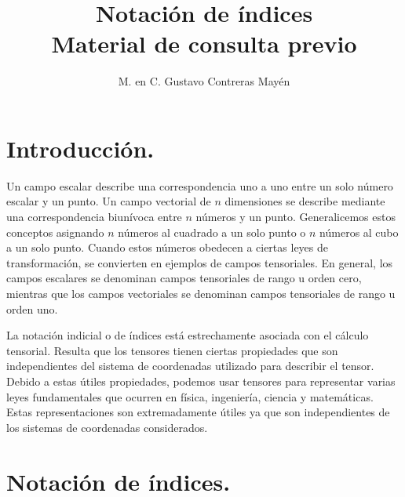 
\usetikzlibrary{babel}
\setlength{\tabcolsep}{12pt}
\title{Notación de índices \\ \large{Material de consulta previo}\vspace{-3ex}}
\author{M. en C. Gustavo Contreras Mayén}
\date{ }

\vspace{-4cm}
\maketitle
\fontsize{14}{14}\selectfont
\tableofcontents
\newpage



\section{Introducción.}

Un campo escalar describe una correspondencia uno a uno entre un solo número escalar y un punto. Un campo vectorial de $n$ dimensiones se describe mediante una correspondencia biunívoca entre $n$ números y un punto. Generalicemos estos conceptos asignando $n$ números al cuadrado a un solo punto o $n$ números al cubo a un solo punto. Cuando estos números obedecen a ciertas leyes de transformación, se convierten en ejemplos de campos tensoriales. En general, los campos escalares se denominan campos tensoriales de rango u orden cero, mientras que los campos vectoriales se denominan campos tensoriales de rango u orden uno.
\par
La notación indicial o de índices está estrechamente asociada con el cálculo tensorial. Resulta que los tensores tienen ciertas propiedades que son independientes del sistema de coordenadas utilizado para describir el tensor. Debido a estas útiles propiedades, podemos usar tensores para representar varias leyes fundamentales que ocurren en física, ingeniería, ciencia y matemáticas. Estas representaciones son extremadamente útiles ya que son independientes de los sistemas de coordenadas considerados.

\section{Notación de índices.}

